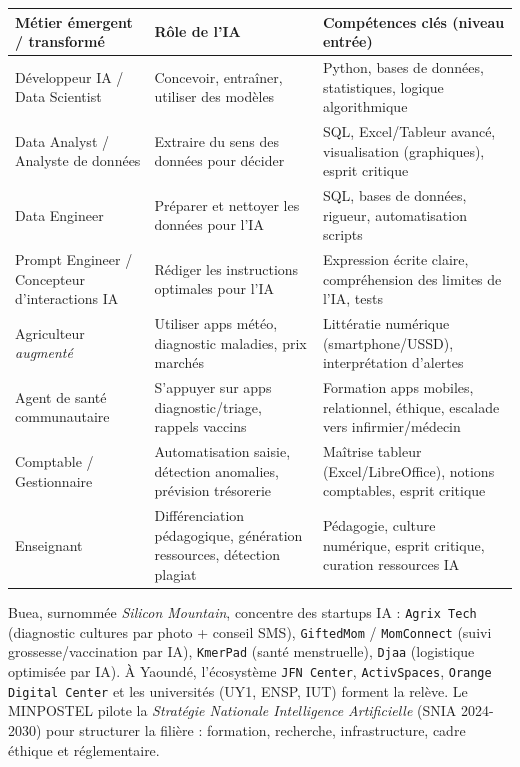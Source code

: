 \documentclass[11pt]{article}
\begin{document}
\begin{center}
\begin{tabularx}{\linewidth}{|l|X|X|}
\hline
\rowcolor{popblueL}
\textbf{Métier émergent / transformé} & \textbf{Rôle de l'IA} & \textbf{Compétences clés (niveau entrée)} \\
\hline
Développeur IA / Data Scientist & Concevoir, entraîner, utiliser des modèles & Python, bases de données, statistiques, logique algorithmique \\
Data Analyst / Analyste de données & Extraire du sens des données pour décider & SQL, Excel/Tableur avancé, visualisation (graphiques), esprit critique \\
Data Engineer & Préparer et nettoyer les données pour l'IA & SQL, bases de données, rigueur, automatisation scripts \\
Prompt Engineer / Concepteur d'interactions IA & Rédiger les instructions optimales pour l'IA & Expression écrite claire, compréhension des limites de l'IA, tests \\
Agriculteur \emph{augmenté} & Utiliser apps météo, diagnostic maladies, prix marchés & Littératie numérique (smartphone/USSD), interprétation d'alertes \\
Agent de santé communautaire & S'appuyer sur apps diagnostic/triage, rappels vaccins & Formation apps mobiles, relationnel, éthique, escalade vers infirmier/médecin \\
Comptable / Gestionnaire & Automatisation saisie, détection anomalies, prévision trésorerie & Maîtrise tableur (Excel/LibreOffice), notions comptables, esprit critique \\
Enseignant & Différenciation pédagogique, génération ressources, détection plagiat & Pédagogie, culture numérique, esprit critique, curation ressources IA \\
\hline
\end{tabularx}
\end{center}

\begin{savaistu}
Buea, surnommée \emph{Silicon Mountain}, concentre des startups IA : \texttt{Agrix Tech} (diagnostic cultures par photo + conseil SMS), \texttt{GiftedMom} / \texttt{MomConnect} (suivi grossesse/vaccination par IA), \texttt{KmerPad} (santé menstruelle), \texttt{Djaa} (logistique optimisée par IA). À Yaoundé, l'écosystème \texttt{JFN Center}, \texttt{ActivSpaces}, \texttt{Orange Digital Center} et les universités (UY1, ENSP, IUT) forment la relève. Le MINPOSTEL pilote la \emph{Stratégie Nationale Intelligence Artificielle} (SNIA 2024-2030) pour structurer la filière : formation, recherche, infrastructure, cadre éthique et réglementaire.
\end{savaistu}
\end{document}
